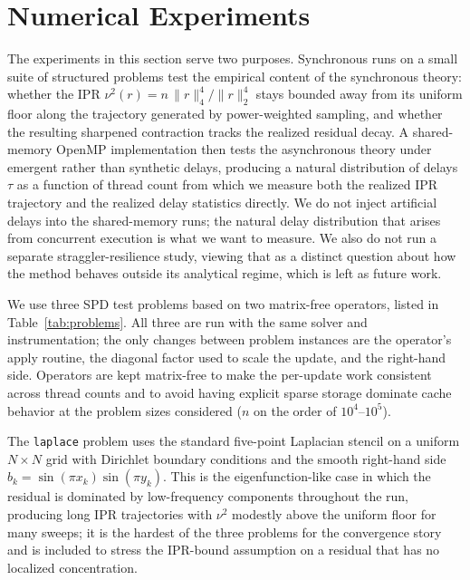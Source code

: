 \documentclass[pdflatex,sn-mathphys-num]{sn-jnl}%
\theoremstyle{thmstyleone}%
\theoremstyle{thmstyletwo}%
\theoremstyle{thmstylethree}%
\begin{document}
\section{Numerical Experiments}
\label{sec:experiments}

The experiments in this section serve two purposes. Synchronous runs on a
small suite of structured problems test the empirical content of the
synchronous theory: whether the IPR
$\nu^2(r) = n\,\|r\|_4^4/\|r\|_2^4$ stays bounded away from its uniform
floor along the trajectory generated by power-weighted sampling, and
whether the resulting sharpened contraction tracks the realized residual
decay. A shared-memory OpenMP implementation then tests the asynchronous
theory under emergent rather than synthetic delays, producing a natural
distribution of delays $\tau$ as a function of thread count from which we
measure both the realized IPR trajectory and the realized delay statistics
directly. We do not inject artificial delays into the shared-memory runs;
the natural delay distribution that arises from concurrent execution is
what we want to measure. We also do not run a separate straggler-resilience
study, viewing that as a distinct question about how the method behaves
outside its analytical regime, which is left as future work.



We use three SPD test problems based on two matrix-free operators, listed
in Table~\ref{tab:problems}. All three are run with the same solver and
instrumentation; the only changes between problem instances are the
operator's apply routine, the diagonal factor used to scale the update,
and the right-hand side. Operators are kept matrix-free to make the
per-update work consistent across thread counts and to avoid having explicit
sparse storage dominate cache behavior at the problem sizes considered
($n$ on the order of $10^4$--$10^5$).

The \texttt{laplace} problem uses the standard five-point Laplacian
stencil on a uniform $N \times N$ grid with Dirichlet boundary conditions
and the smooth right-hand side $b_k = \sin(\pi x_k)\sin(\pi y_k)$. This
is the eigenfunction-like case in which the residual is dominated by
low-frequency components throughout the run, producing long IPR
trajectories with $\nu^2$ modestly above the uniform floor for many
sweeps; it is the hardest of the three problems for the convergence
story and is included to stress the IPR-bound assumption on a residual
that has no localized concentration.
\end{document}
